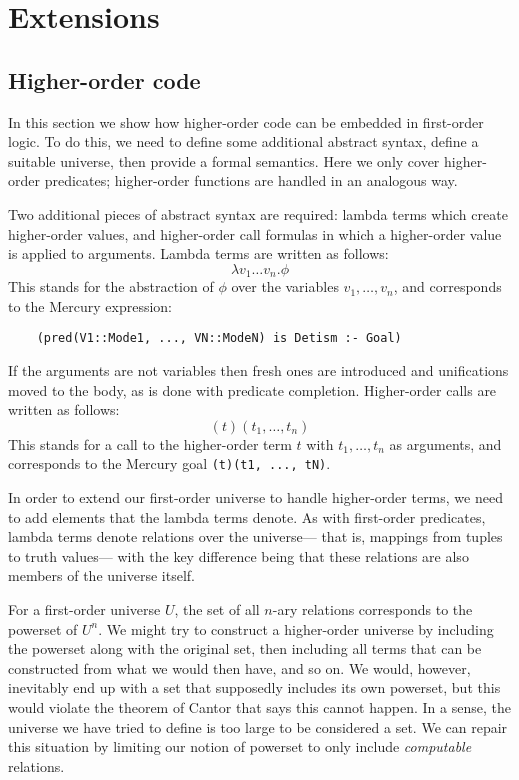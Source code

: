 \chapter{Extensions}
\label{sec:extensions}

\section{Higher-order code}
\label{sec:ho}

In this section we show how higher-order code
can be embedded in first-order logic.
To do this, we need to define some additional abstract syntax,
define a suitable universe,
then provide a formal semantics.
Here we only cover higher-order predicates;
higher-order functions are handled in an analogous way.

Two additional pieces of abstract syntax are required:
lambda terms which create higher-order values,
and higher-order call formulas in which
a higher-order value is applied to arguments.
Lambda terms are written as follows:
\[ \lambda v_1 \ldots v_n. \phi \]
This stands for the abstraction of $\phi$
over the variables $v_1, \ldots, v_n$,
and corresponds to the Mercury expression:
\begin{verbatim}
    (pred(V1::Mode1, ..., VN::ModeN) is Detism :- Goal)
\end{verbatim}
If the arguments are not variables
then fresh ones are introduced and unifications moved to the body,
as is done with predicate completion.
Higher-order calls are written as follows:
\[
(t)(t_1, \ldots, t_n)
\]
This stands for a call to the higher-order term $t$
with $t_1, \ldots, t_n$ as arguments,
and corresponds to the Mercury goal \texttt{(t)(t1, ..., tN)}.

In order to extend our first-order universe
to handle higher-order terms,
we need to add elements that the lambda terms denote.
As with first-order predicates,
lambda terms denote relations over the universe---%
that is, mappings from tuples to truth values---%
with the key difference being that
these relations are also members of the universe itself.

For a first-order universe $U$,
the set of all $n$-ary relations corresponds to
the powerset of $U^n$.
We might try to construct a higher-order universe
by including the powerset along with the original set,
then including all terms
that can be constructed from what we would then have,
and so on.
We would, however, inevitably end up with a set
that supposedly includes its own powerset,
but this would violate the theorem of Cantor
that says this cannot happen.
In a sense,
the universe we have tried to define is too large to be considered a set.
We can repair this situation by limiting our notion of powerset
to only include \emph{computable} relations.

